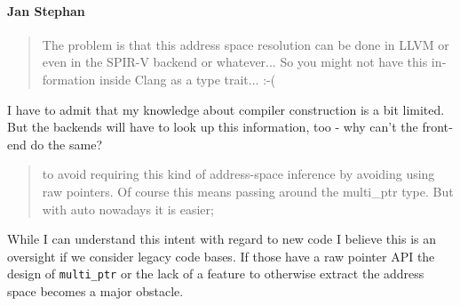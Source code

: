\begin{otherlanguage}{english}
    \paragraph{Jan Stephan} \begin{quote}
                                The problem is that this address space
                                resolution can be done in LLVM or even in the
                                SPIR-V backend or whatever... So you might not
                                have this information inside Clang as a type
                                trait... :-(
                            \end{quote}
                            I have to admit that my knowledge about compiler
                            construction is a bit limited. But the backends will
                            have to look up this information, too - why can't
                            the frontend do the same?
                            \begin{quote}
                                to avoid requiring this kind of address-space
                                inference by avoiding using raw pointers. Of
                                course this means passing around the
                                multi\_ptr type. But with auto nowadays it is
                                easier;
                            \end{quote}
                            While I can understand this intent with regard to
                            new code I believe this is an oversight if we
                            consider legacy code bases. If those have a raw
                            pointer API the design of \texttt{multi\_ptr} or
                            the lack of a feature to otherwise extract the
                            address space becomes a major obstacle.
\end{otherlanguage}
